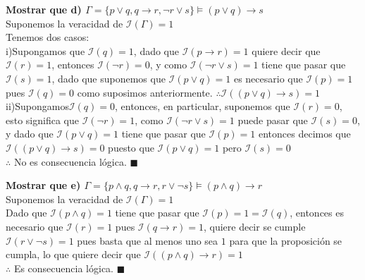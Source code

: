 \textbf{Mostrar que d) $\Gamma = \{p\lor q, q\rightarrow r, \neg r \lor s\}\vDash(p\lor q)\rightarrow s$}\\
Suponemos la veracidad de $\mathcal{I}(\Gamma)=1$\\
Tenemos dos casos:\\
\indent i)Supongamos que $\mathcal{I}(q)=1$, dado que $\mathcal{I}(p\rightarrow r)=1$ quiere decir que $\mathcal{I}(r)=1$, entonces $\mathcal{I}(\neg r)=0$, y como $\mathcal{I}(\neg r\lor s)=1$ tiene que pasar que $\mathcal{I}(s)=1$, dado que suponemos que $\mathcal{I}(p\lor q)=1$ es necesario que $\mathcal{I}(p)=1$ pues $\mathcal{I}(q)=0$ como suposimos anteriormente. $\therefore\mathcal{I}((p\lor q)\rightarrow s)=1$\\
\indent ii)Supongamos$\mathcal{I}(q)=0$, entonces, en particular, suponemos que $\mathcal{I}(r)=0$, esto significa que $\mathcal{I}(\neg r)=1$, como $\mathcal{I}(\neg r \lor s)=1$ puede pasar que $\mathcal{I}(s)=0$, y dado que $\mathcal{I}(p\lor q)=1$ tiene que pasar que $\mathcal{I}(p)=1$ entonces decimos que $\mathcal{I}((p\lor q)\rightarrow s)=0$ puesto que $\mathcal{I}(p\lor q)=1$ pero $\mathcal{I}(s)=0$\\
$\therefore$ No es consecuencia lógica. $\blacksquare$
\vspace{5px}

\textbf{Mostrar que e) $\Gamma = \{p\land q, q\rightarrow r, r \lor \neg s\}\vDash (p \land q)\rightarrow r$}\\
Suponemos la veracidad de $\mathcal{I}(\Gamma)=1$\\
Dado que $\mathcal{I}(p\land q)=1$ tiene que pasar que $\mathcal{I}(p)=1=\mathcal{I}(q)$, entonces es necesario que $\mathcal{I}(r)=1$ pues $\mathcal{I}(q\rightarrow r)=1$, quiere decir se cumple 
$\mathcal{I}(r \lor \neg s)=1$ pues basta que al menos uno sea $1$ para que la proposición se cumpla, lo que quiere decir que $\mathcal{I}((p\land q)\rightarrow r)=1$\\
$\therefore$ Es consecuencia lógica. $\blacksquare$